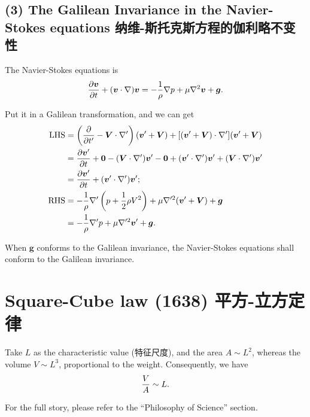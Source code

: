 \subsection*{(3) The Galilean Invariance in the Navier-Stokes
equations
纳维-斯托克斯方程的伽利略不变性}\label{the-galilean-invariance-in-the-navier-stokes-equations-ux7eb3ux7ef4-ux65afux6258ux514bux65afux65b9ux7a0bux7684ux4f3dux5229ux7565ux4e0dux53d8ux6027}

The Navier-Stokes equations is
\[ {\partial \boldsymbol v \over \partial t} +(\boldsymbol v \cdot \nabla) \boldsymbol v = - {1 \over \rho} \nabla p + \mu \nabla^2 \boldsymbol v + \boldsymbol g.\]

Put it in a Galilean transformation, and we can get \begin{align*}
    \text{LHS} & = \left( {\partial \over \partial t'} - \boldsymbol V \cdot \nabla' \right)(\boldsymbol v' + \boldsymbol V) + [(\boldsymbol v' + \boldsymbol V) \cdot \nabla'](\boldsymbol v' + \boldsymbol V) \\
    & = {\partial \boldsymbol v' \over \partial t} + \boldsymbol 0 - (\boldsymbol V \cdot \nabla') \boldsymbol v' - \boldsymbol 0 + (\boldsymbol v' \cdot \nabla') \boldsymbol v' + (\boldsymbol V \cdot \nabla') \boldsymbol v' \\
    & = {\partial \boldsymbol v' \over \partial t} + (\boldsymbol v' \cdot \nabla') \boldsymbol v'; \\
    \text{RHS} & = - {1 \over \rho} \nabla' \left( p + {1 \over 2} \rho V^2 \right) + \mu \nabla'^2 (\boldsymbol v' + \boldsymbol V) + \boldsymbol g \\
    & = - {1 \over \rho} \nabla' p + \mu \nabla'^2 \boldsymbol v' + \boldsymbol g. \\
\end{align*}

When \(\boldsymbol g\) conforms to the Galilean invariance, the
Navier-Stokes equations shall conform to the Galilean invariance.

\section{Square-Cube law (1638)
平方-立方定律}\label{square-cube-law-1638-ux5e73ux65b9-ux7acbux65b9ux5b9aux5f8b}

Take \(L\) as the characteristic value (特征尺度), and the area
\(A \sim L^2\), whereas the volume \(V \sim L^3\), proportional to the
weight. Consequently, we have \[{V \over A} \sim L.\]

For the full story, please refer to the ``Philosophy of Science''
section.

